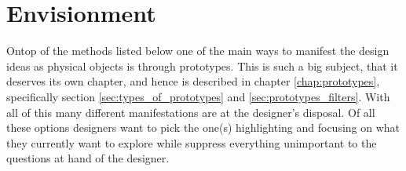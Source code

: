 \section{Envisionment} \label{sec:envisionment}
Ontop of the methods listed below one of the main ways to manifest the design ideas as physical objects is through prototypes. This is such a big subject, that it deserves its own chapter, and hence is described in chapter \ref{chap:prototypes}, specifically section \ref{sec:types_of_prototypes} and \ref{sec:prototypes_filters}. With all of this many different manifestations are at the designer's disposal. Of all these options designers want to pick the one(s) highlighting and focusing on what they currently want to explore while suppress everything unimportant to the questions at hand of the designer. \cite[p. 167]{benyon_14}






